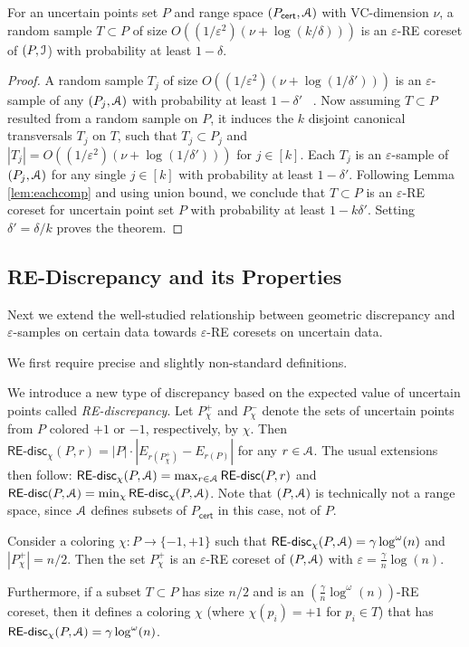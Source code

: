 \documentclass[11pt]{myclass}
\newcommand{\eps}{\varepsilon}
\newcommand{\Eu}[1]{\ensuremath{\EuScript{#1}}}
\newcommand{\disc}{\textsf{disc}}
\newcommand{\cert}{\textsf{cert}}
\newcommand{\RE}{\textsf{RE}\xspace}
\newcommand{\REd}{\RE\text{-}\disc}
\begin{document}
\begin{theorem}
For an uncertain points set $P$ and range space $(P_\cert, \Eu{A})$ with VC-dimension $\nu$,  a random sample $T \subset P$ of size $O((1/\eps^2) (\nu + \log (k/\delta)))$ is an $\eps$-\RE coreset of $(P,\Eu{I}$) with probability at least $1- \delta$.
\label{thm:RE-samp}
\end{theorem}

\begin{proof} 
A random sample $T_j$ of size $O((1/\eps^2) (\nu + \log (1/\delta')))$ is an $\eps$-sample of any $(P_j, \Eu{A})$ with probability at least $1-\delta'$ ~\cite{LLS01}.  Now assuming $T \subset P$ resulted from a random sample on $P$, it induces the $k$ disjoint canonical transversals $T_j$ on $T$, such that $T_j \subset P_j$ and $|T_j| = O((1/\eps^2) (\nu + \log (1/\delta')))$ for $j \in [k]$.  
Each $T_j$ is an $\eps$-sample of $(P_j,\Eu{A})$ for any single $j \in [k]$ with probability at least $1 - \delta'$. 
Following Lemma \ref{lem:eachcomp} and using union bound, we conclude that $T \subset P$ is an $\eps$-\RE coreset for uncertain point set $P$ with probability at least $1 - k\delta'$.  Setting $\delta' = \delta/k$ proves the theorem.  
\end{proof}
 

\subsection{\RE-Discrepancy and its Properties}
\label{sec:RE-disc}
Next we extend the well-studied relationship between geometric discrepancy and $\eps$-samples on certain data towards $\eps$-\RE coresets on uncertain data.  

We first require precise and slightly non-standard definitions.
 
We introduce a new type of discrepancy based on the expected value of uncertain points called \emph{\RE-discrepancy}.  Let $P_\chi^+$ and $P_\chi^-$ denote the sets of uncertain points from $P$ colored $+1$ or $-1$, respectively, by $\chi$.  
Then $\REd_\chi(P,r) =  |P| \cdot |E_{r(P_\chi^+)} - E_{r(P)}|$ for any $r \in \Eu{A}$. 
The usual extensions then follow:
$\REd_\chi(P,\Eu{A}) = \max_{r \in \Eu{A}} \REd(P,r)$ and
$\REd(P,\Eu{A}) = \min_\chi \REd_\chi(P,\Eu{A})$.  
Note that $(P,\Eu{A})$ is technically not a range space, since $\Eu{A}$ defines subsets of $P_\cert$ in this case, not of $P$.  


\begin{lemma}\label{lem:REcolor}
Consider a coloring $\chi : P \to \{-1,+1\}$ such that $\REd_\chi(P,\Eu{A}) = \gamma \log^\omega(n)$ and $|P_\chi^+| = n/2$.  
Then the set $P_\chi^+$ is an $\eps$-\RE coreset of $(P,\Eu{A})$ with $\eps = \frac{ \gamma}{n} \log (n)$.

Furthermore, if a subset $T \subset P$ has size $n/2$ and is an $(\frac{ \gamma}{n} \log^\omega (n))$-\RE coreset, then it defines a coloring $\chi$ (where $\chi(p_i) = +1$ for $p_i \in T$) that has $\REd_\chi(P,\Eu{A}) = \gamma \log^\omega(n)$.  
\end{lemma}
\end{document}
